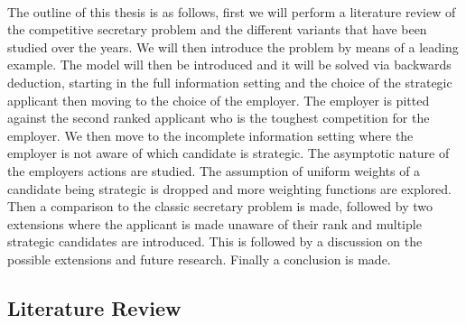 \documentclass{article}
\begin{document}
\\[2ex]
The outline of this thesis is as follows, first we will perform a literature review of the competitive secretary problem and the different variants that have been studied over the years. We will then introduce the problem by means of a leading example. The model will then be introduced and it will be solved via backwards deduction, starting in the full information setting and the choice of the strategic applicant then moving to the choice of the employer. The employer is pitted against the second ranked applicant who is the toughest competition for the employer.  We then move to the incomplete information setting where the employer is not aware of which candidate is strategic. The asymptotic nature of the employers actions are studied. The assumption of uniform weights of a candidate being strategic is dropped and more weighting functions are explored. Then a comparison to the classic secretary problem is made, followed by two extensions where the applicant is made unaware of their rank and multiple strategic candidates are introduced. This is followed by a discussion on the possible extensions and future research. Finally a conclusion is made.

\subsection{Literature Review}
\end{document}
